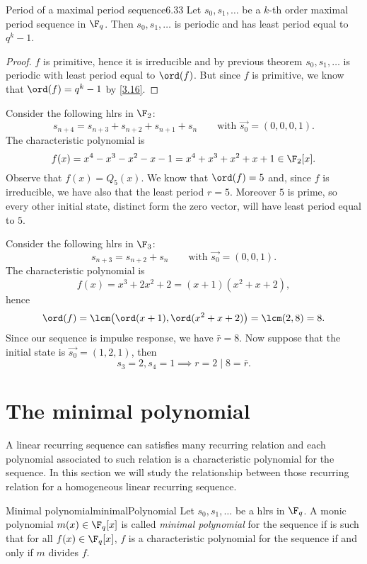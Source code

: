 \begin{teor}{Period of a maximal period sequence}{6.33}
	Let \(s_0,s_1,\ldots\) be a \(k\)-th order maximal period sequence in \(\F_q\). Then \(s_0,s_1,\ldots\) is periodic and has least period equal to \(q^k-1\).
\end{teor}

\begin{proof}
	\(f\) is primitive, hence it is irreducible and by previous theorem \(s_0,s_1,\ldots\) is periodic with least period equal to \(\ord(f)\). But since \(f\) is primitive, we know that \(\ord(f)=q^k-1\) by \autoref{3.16}.
\end{proof}

\begin{ese}
	Consider the following hlrs in \(\F_2\):
	\[
		s_{n+4}=s_{n+3}+s_{n+2}+s_{n+1}+s_n \qquad\text{with }\vec{s_0}=(0,0,0,1).
	\]
	The characteristic polynomial is
	\[
		f(x) = x^4-x^3-x^2-x-1 = x^4+x^3+x^2+x+1 \in \F_2[x].
	\]
	Observe that \(f(x) =Q_5(x)\). We know that \(\ord(f)=5\) and, since \(f\) is irreducible, we have also that the least period \(r=5\). Moreover \(5\) is prime, so every other initial state, distinct form the zero vector, will have least period equal to \(5\).
\end{ese}

\begin{ese}
	Consider the following hlrs in \(\F_3\):
	\[
		s_{n+3}=s_{n+2}+s_n \qquad\text{with }\vec{s_0}=(0,0,1).
	\]
	The characteristic polynomial is
	\[
		f(x) = x^3+2x^2+2 = (x+1)(x^2+x+2),
	\]
	hence
	\[
		\ord(f) = \lcm\big(\ord(x+1),\ord(x^2+x+2)\big) = \lcm(2,8) = 8.
	\]
	Since our sequence is impulse response, we have \(\bar{r}=8\).
	Now suppose that the initial state is \(\vec{s_0}=(1,2,1)\), then
	\[
		s_3=2,s_4 = 1 \implies r = 2 \mid 8 = \bar{r}.
	\]
\end{ese}

\section{The minimal polynomial}

A linear recurring sequence can satisfies many recurring relation and each polynomial associated to such relation is a characteristic polynomial for the sequence. In this section we will study the relationship between those recurring relation for a homogeneous linear recurring sequence.

\begin{defn}{Minimal polynomial}{minimalPolynomial}
	Let \(s_0,s_1,\ldots\) be a hlrs in \(\F_q\). A monic polynomial \(m(x)\in\F_q[x]\) is called \emph{minimal polynomial} for the sequence if is such that for all \(f(x)\in\F_q[x]\), \(f\) is a characteristic polynomial for the sequence if and only if \(m\) divides \(f\).
\end{defn}

